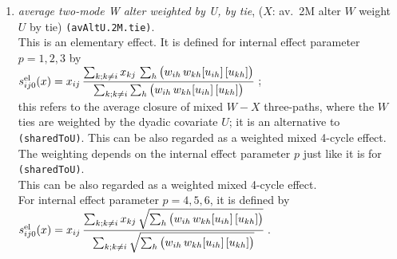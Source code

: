 \documentclass[a4paper,fleqn,11pt]{article}
\newcommand{\+}{\, + \,}
\newcommand{\vit}{\theenumi}
\newcounter{savenumi}
\begin{document}
\begin{enumerate}
 Note that since this is the evaluation function for actor $i$ with
 respect to network $X$, only the $x_{ij}$ tie indicator in the formula,
 corresponding to  the tie $i \stackrel{X}{\rightarrow} j$,
 is the dependent variable here.\\
 The interpretation is that actors have the tendency to make the same
 outgoing $X$-choices as those ($k$) with whom they share many outgoing $W$-ties,
 weighted by $U$. There is no centering as in \texttt{sharedTo}.


 {\em average two-mode W alter by tie}, ($X$: av.\ 2M alter $W$ by tie)
        \texttt{(avAlt.2M.tie)}. \\[0.2em]

 \item
 {\em average two-mode W alter weighted by U, by tie}, ($X$: av.\ 2M alter $W$ weight $U$ by tie)
        \texttt{(avAltU.2M.tie)}. \\[0.2em]
 This is an elementary effect.  It is defined for internal effect parameter $p=1,2,3$ by \\[0.4em]
 $s^{\rm el}_{ij\vit}(x) =  \displaystyle x_{ij}\, \frac{\sum_{k; k \neq i} x_{kj}\,
                   \sum_{h}   \big( w_{ih}\, w_{kh} [u_{ih}]\, [u_{kh}] \big )}
                  {   \sum_{k; k \neq i}  \sum_{h}  \big( w_{ih}\, w_{kh} [u_{ih}]\, [u_{kh}] \big )}
                \,$;\\[0.2em]
 this refers to the average closure of mixed $W-X$ three-paths, where the $W$ ties
 are weighted by the dyadic covariate $U$; it is an alternative to \texttt{(sharedToU)}.
 This can be also regarded as a weighted mixed 4-cycle effect.\\
 The weighting depends on the internal effect parameter $p$ just like it is
 for \texttt{(sharedToU)}.\\
 This can be also regarded as a weighted mixed 4-cycle effect.\\

  For internal effect parameter $p = 4,5,6$, it is defined by \\[0.4em]
 $s^{\rm el}_{ij\vit}(x) =  \displaystyle x_{ij}\, \frac{\sum_{k; k \neq i} x_{kj}\,
                  \sqrt{ \sum_{h}   \big( w_{ih}\, w_{kh} [u_{ih}]\, [u_{kh}] \big )}}
                  {   \sum_{k; k \neq i} \sqrt{ \sum_{h}  \big( w_{ih}\, w_{kh} [u_{ih}]\, [u_{kh}] \big )}}
                \,$.\\[0.2em]

\setcounter{savenumi}{\value{enumi}}
\end{enumerate}
\end{document}

